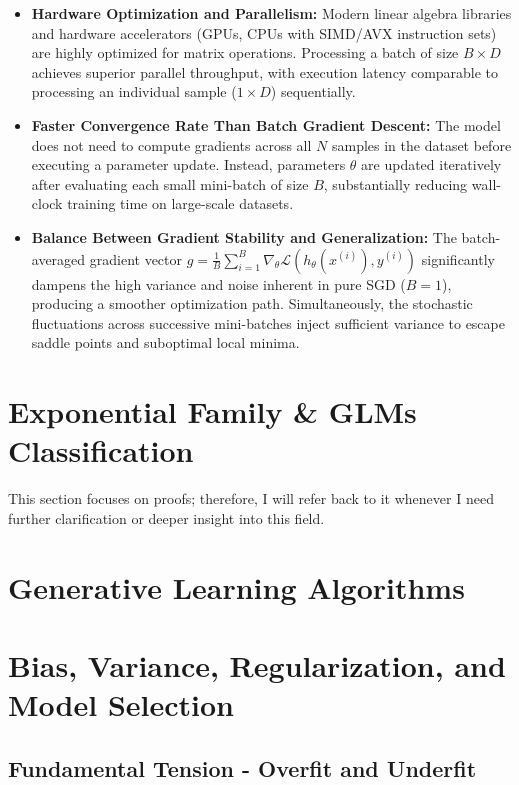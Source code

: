 \documentclass[12pt,a4paper]{report}
\begin{document}
\begin{itemize}
    \item \textbf{Hardware Optimization and Parallelism:} 
    Modern linear algebra libraries and hardware accelerators (GPUs, CPUs with SIMD/AVX instruction sets) are highly optimized for matrix operations. Processing a batch of size $B \times D$ achieves superior parallel throughput, with execution latency comparable to processing an individual sample ($1 \times D$) sequentially.

    \item \textbf{Faster Convergence Rate Than Batch Gradient Descent:} 
    The model does not need to compute gradients across all $N$ samples in the dataset before executing a parameter update. Instead, parameters $\theta$ are updated iteratively after evaluating each small mini-batch of size $B$, substantially reducing wall-clock training time on large-scale datasets.

    \item \textbf{Balance Between Gradient Stability and Generalization:} 
    The batch-averaged gradient vector $g = \frac{1}{B} \sum_{i=1}^B \nabla_\theta \mathcal{L}(h_\theta(x^{(i)}), y^{(i)})$ significantly dampens the high variance and noise inherent in pure SGD ($B = 1$), producing a smoother optimization path. Simultaneously, the stochastic fluctuations across successive mini-batches inject sufficient variance to escape saddle points and suboptimal local minima.
\end{itemize}

\section{Exponential Family \& GLMs Classification}

This section focuses on proofs; therefore, I will refer back to it whenever I need further clarification or deeper insight into this field.

\section{Generative Learning Algorithms}


\section{Bias, Variance, Regularization, and Model Selection}

\subsection{Fundamental Tension - Overfit and Underfit}
\end{document}
